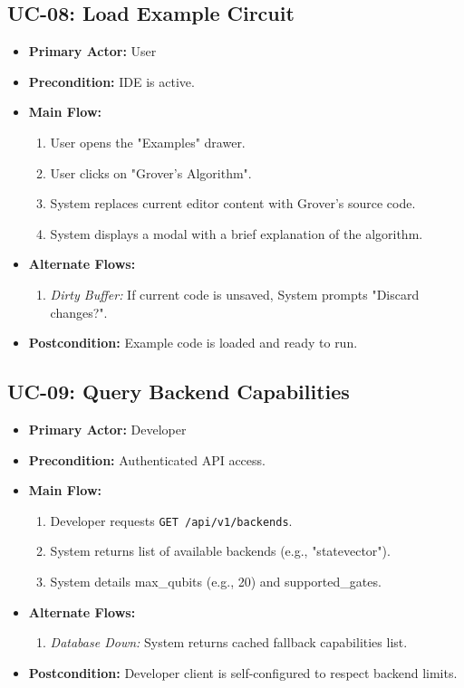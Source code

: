 \subsection{UC-08: Load Example Circuit}
\begin{itemize}
    \item \textbf{Primary Actor:} User
    \item \textbf{Precondition:} IDE is active.
    \item \textbf{Main Flow:}
    \begin{enumerate}
        \item User opens the "Examples" drawer.
        \item User clicks on "Grover's Algorithm".
        \item System replaces current editor content with Grover's source code.
        \item System displays a modal with a brief explanation of the algorithm.
    \end{enumerate}
    \item \textbf{Alternate Flows:}
    \begin{enumerate}
        \item [3a] \textit{Dirty Buffer:} If current code is unsaved, System prompts "Discard changes?".
    \end{enumerate}
    \item \textbf{Postcondition:} Example code is loaded and ready to run.
\end{itemize}




\subsection{UC-09: Query Backend Capabilities}
\begin{itemize}
    \item \textbf{Primary Actor:} Developer
    \item \textbf{Precondition:} Authenticated API access.
    \item \textbf{Main Flow:}
    \begin{enumerate}
        \item Developer requests \texttt{GET /api/v1/backends}.
        \item System returns list of available backends (e.g., "statevector").
        \item System details max\_qubits (e.g., 20) and supported\_gates.
    \end{enumerate}
    \item \textbf{Alternate Flows:}
    \begin{enumerate}
        \item [2a] \textit{Database Down:} System returns cached fallback capabilities list.
    \end{enumerate}
    \item \textbf{Postcondition:} Developer client is self-configured to respect backend limits.
\end{itemize}

